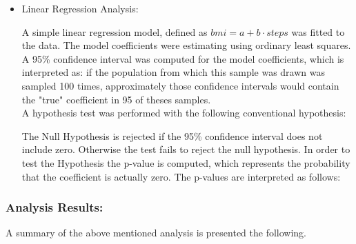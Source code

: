 \documentclass[11pt]{iopart}
\begin{document}
\begin{itemize}
\item Linear Regression Analysis:

A simple linear regression model, defined as $bmi = a +  b \cdot steps$ was fitted to the data. 
The model coefficients were estimating using ordinary least squares.
\\

A 95\% confidence interval was computed for the model coefficients, which is interpreted as: if the population from which this sample was drawn was sampled 100 times, approximately those confidence intervals would contain the "true" coefficient in 95 of theses samples.
\\

A hypothesis test was performed with the following conventional hypothesis:

The Null Hypothesis is rejected if the 95\% confidence interval does not include zero. Otherwise the test fails to reject the null hypothesis.
In order to test the Hypothesis the p-value is computed, which represents the probability that the coefficient is actually zero.
The p-values are interpreted as follows: 
 
\end{itemize}

 \subsubsection{Analysis Results:}
 
A summary of the above mentioned analysis is presented the following.
\end{document}
